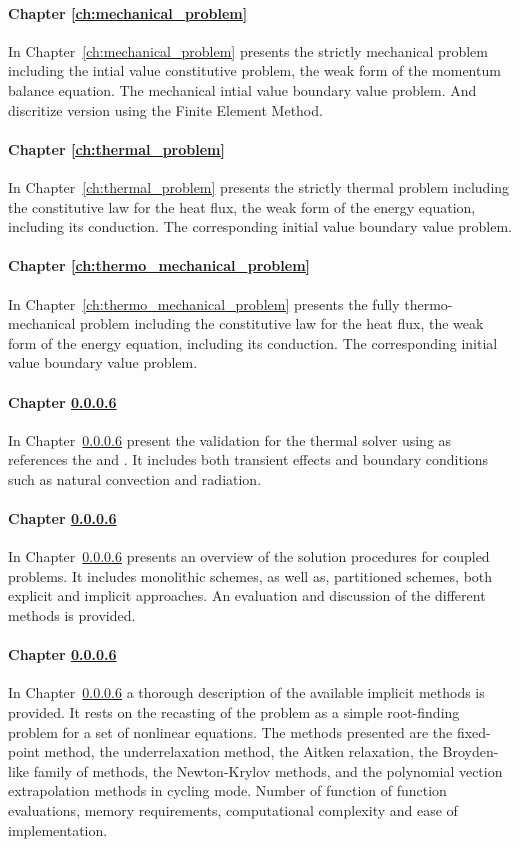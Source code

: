\paragraph{Chapter \ref{ch:mechanical_problem}}
In Chapter~\ref{ch:mechanical_problem} presents the strictly mechanical problem including the intial value constitutive problem, the weak form of the momentum balance equation.
The mechanical intial value boundary value problem.
And discritize version using the Finite Element Method.

\paragraph{Chapter \ref{ch:thermal_problem}}
In Chapter~\ref{ch:thermal_problem} presents the strictly thermal problem including the constitutive law for the heat flux, the weak form of the energy equation, including its conduction.
The corresponding initial value boundary value problem.

\paragraph{Chapter \ref{ch:thermo_mechanical_problem}}
In Chapter~\ref{ch:thermo_mechanical_problem} presents the fully thermo-mechanical problem including the constitutive law for the heat flux, the weak form of the energy equation, including its conduction.
The corresponding initial value boundary value problem.

\paragraph{Chapter \ref{}}
In Chapter~\ref{} present the validation for the thermal solver using as references the \cite{DINEN1991_1_2} and \cite{NAFEMSbenchmarks}.
It includes both transient effects and boundary conditions such as natural convection and radiation.

\paragraph{Chapter \ref{}}
In Chapter~\ref{} presents an overview of the solution procedures for coupled problems.
It includes monolithic schemes, as well as, partitioned schemes, both explicit and implicit approaches.
An evaluation and discussion of the different methods is provided.

\paragraph{Chapter \ref{}}
In Chapter~\ref{} a thorough description of the available implicit methods is provided.
It rests on the recasting of the problem as a simple root-finding problem for a set of nonlinear equations.
The methods presented are the fixed-point method, the underrelaxation method, the Aitken relaxation, the Broyden-like family of methods, the Newton-Krylov methods, and the polynomial vection extrapolation methods in cycling mode.
Number of function of function evaluations, memory requirements, computational complexity and ease of implementation.

